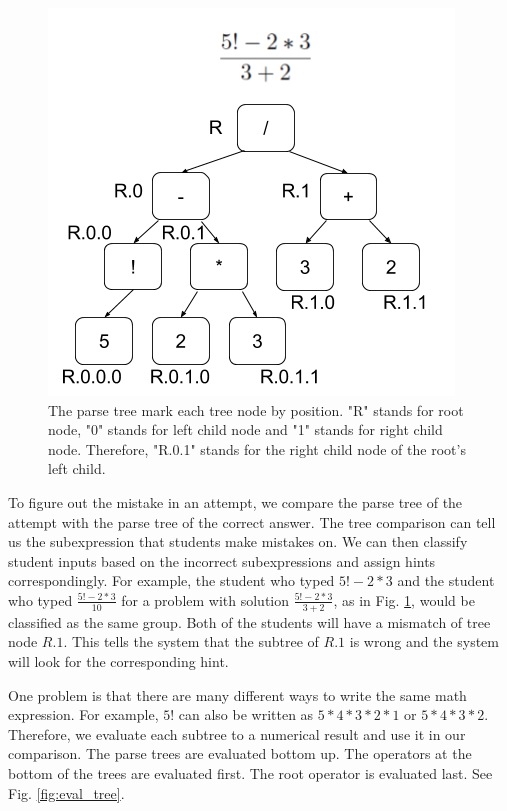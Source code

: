 \documentclass{llncs}
\begin{document}
\begin{figure}[ht]
   \centering
   \includegraphics[width=.5\textwidth]{image/Parse_Trees.png}
   \caption{The parse tree mark each tree node by position. "R" stands for root node, "0" stands for left child node and "1" stands for right child node. Therefore, "R.0.1" stands for the right child node of the root's left child.}
   \label{fig:parse_tree}
\end{figure}

To figure out the mistake in an attempt, we compare the parse tree of the attempt with the parse tree of the correct answer. The tree comparison can tell us the subexpression that students make mistakes on. We can then classify student inputs based on the incorrect subexpressions and assign hints correspondingly. For example, the student who typed $5!-2*3$ and the student who typed $\frac{5!-2*3}{10}$ for a problem with solution $\frac{5!-2*3}{3+2}$, as in Fig. \ref{fig:parse_tree}, would be classified as the same group. Both of the students will have a mismatch of tree node $R.1$. This tells the system that the subtree of $R.1$ is wrong and the system will look for the corresponding hint.

One problem is that there are many different ways to write the same math expression. For example, $5!$ can also be written as $5*4*3*2*1$ or $5*4*3*2$. Therefore, we evaluate each subtree to a numerical result and use it in our comparison. The parse trees are evaluated bottom up. The operators at the bottom of the trees are evaluated first. The root operator is evaluated last. See Fig. \ref{fig:eval_tree}. 
\end{document}
